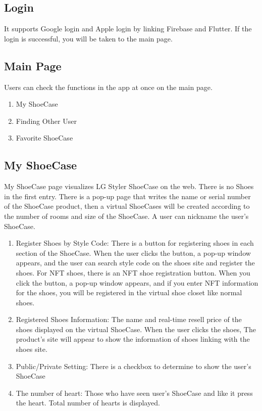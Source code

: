 \documentclass[conference]{IEEEtran}
\begin{document}
\subsection{Login}
It supports Google login and Apple login by linking Firebase and Flutter. If the login is successful, you will be taken to the main page.\\

\subsection{Main Page}
Users can check the functions in the app at once on the main page. \\
\begin{enumerate}
    \item My ShoeCase\\
    \item Finding Other User\\
    \item Favorite ShoeCase\\
\end{enumerate}

\subsection{My ShoeCase}
My ShoeCase page visualizes LG Styler ShoeCase on the web. There is no Shoes in the first entry. There is a pop-up page that writes the name or serial number of the ShoeCase product, then a virtual ShoeCases will be created according to the number of rooms and size of the ShoeCase. A user can nickname the user's ShoeCase.
\\
\begin{enumerate}
    \item Register Shoes by Style Code: There is a button for registering shoes in each section of the ShoeCase. When the user clicks the button, a pop-up window appears, and the user can search style code on the shoes site and register the shoes. For NFT shoes, there is an NFT shoe registration button. When you click the button, a pop-up window appears, and if you enter NFT information for the shoes, you will be registered in the virtual shoe closet like normal shoes.
\\
    \item Registered Shoes Information: The name and real-time resell price of the shoes displayed on the virtual ShoeCase. When the user clicks the shoes, The product’s site will appear to show the information of shoes linking with the shoes site.
\\
    \item Public/Private Setting: There is a checkbox to determine to show the user's ShoeCase
\\
    \item The number of heart: Those who have seen user's ShoeCase and like it press the heart. Total number of hearts is displayed.
\\
\end{enumerate}
\end{document}

